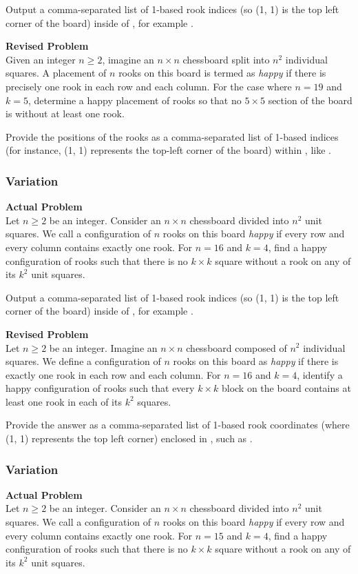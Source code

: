 Output a comma-separated list of 1-based rook indices (so (1, 1) is the top left corner of the board) inside of \boxed, for example .

\textbf{Revised Problem}\\
Given an integer $n \geq 2$, imagine an $n \times n$ chessboard split into $n^2$ individual squares. A placement of $n$ rooks on this board is termed as \textit{happy} if there is precisely one rook in each row and each column. For the case where $n=19$ and $k=5$, determine a happy placement of rooks so that no $5 \times 5$ section of the board is without at least one rook.

Provide the positions of the rooks as a comma-separated list of 1-based indices (for instance, (1, 1) represents the top-left corner of the board) within \boxed, like .

\subsubsection{Variation}
\textbf{Actual Problem}\\
Let $n \geq 2$ be an integer. Consider an $n \times n$ chessboard divided into $n^2$ unit squares.
We call a configuration of $n$ rooks on this board \textit{happy} if every row and every column contains exactly one rook. 
For $n=16$ and $k=4$, find a happy configuration of rooks such that there is no $k \times k$ square without a rook on any of its $k^2$ unit squares.


Output a comma-separated list of 1-based rook indices (so (1, 1) is the top left corner of the board) inside of \boxed, for example .

\textbf{Revised Problem}\\
Let $n \geq 2$ be an integer. Imagine an $n \times n$ chessboard composed of $n^2$ individual squares. We define a configuration of $n$ rooks on this board as \textit{happy} if there is exactly one rook in each row and each column. For $n=16$ and $k=4$, identify a happy configuration of rooks such that every $k \times k$ block on the board contains at least one rook in each of its $k^2$ squares.

Provide the answer as a comma-separated list of 1-based rook coordinates (where (1, 1) represents the top left corner) enclosed in \boxed, such as .

\subsubsection{Variation}
\textbf{Actual Problem}\\
Let $n \geq 2$ be an integer. Consider an $n \times n$ chessboard divided into $n^2$ unit squares.
We call a configuration of $n$ rooks on this board \textit{happy} if every row and every column contains exactly one rook. 
For $n=15$ and $k=4$, find a happy configuration of rooks such that there is no $k \times k$ square without a rook on any of its $k^2$ unit squares.


